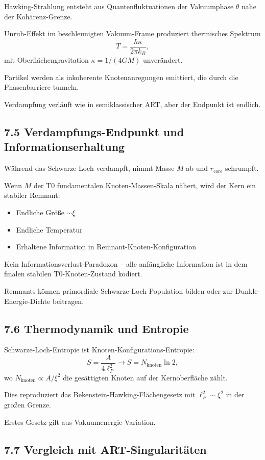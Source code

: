	Hawking-Strahlung entsteht aus Quantenfluktuationen der Vakuumphase $\theta$ nahe der Kohärenz-Grenze.
	
	Unruh-Effekt im beschleunigten Vakuum-Frame produziert thermisches Spektrum
	\[
	T = \frac{\hbar \kappa}{2\pi k_B},
	\]
	mit Oberflächengravitation $\kappa = 1/(4GM)$ unverändert.
	
	Partikel werden als inkoherente Knotenanregungen emittiert, die durch die Phasenbarriere tunneln.
	
	Verdampfung verläuft wie in semiklassischer ART, aber der Endpunkt ist endlich.
	
	\subsection{7.5 Verdampfungs-Endpunkt und Informationserhaltung}
	
	Während das Schwarze Loch verdampft, nimmt Masse $M$ ab und $r_{\text{core}}$ schrumpft.
	
	Wenn $M$ der T0 fundamentalen Knoten-Massen-Skala nähert, wird der Kern ein stabiler Remnant:
	\begin{itemize}
		\item Endliche Größe $\sim \xi$
		\item Endliche Temperatur
		\item Erhaltene Information in Remnant-Knoten-Konfiguration
	\end{itemize}
	
	Kein Informationsverlust-Paradoxon – alle anfängliche Information ist in dem finalen stabilen T0-Knoten-Zustand kodiert.
	
	Remnants können primordiale Schwarze-Loch-Population bilden oder zur Dunkle-Energie-Dichte beitragen.
	
	\subsection{7.6 Thermodynamik und Entropie}
	
	Schwarze-Loch-Entropie ist Knoten-Konfigurations-Entropie:
	\[
	S = \frac{A}{4 \ell_P^2} \to S = N_{\text{knoten}} \ln 2,
	\]
	wo $N_{\text{knoten}} \propto A / \xi^2$ die gesättigten Knoten auf der Kernoberfläche zählt.
	
	Dies reproduziert das Bekenstein-Hawking-Flächengesetz mit $\ell_P^2 \sim \xi^2$ in der großen Grenze.
	
	Erstes Gesetz gilt aus Vakuumenergie-Variation.
	
	\subsection{7.7 Vergleich mit ART-Singularitäten}
	
